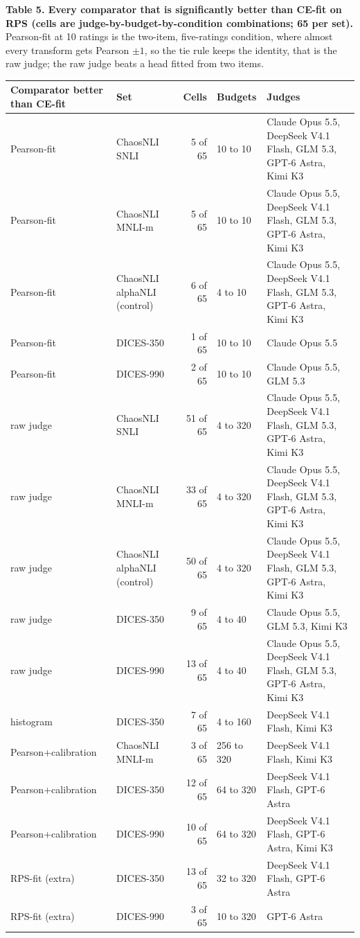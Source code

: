 \documentclass[10pt]{article}
\begin{document}
\textbf{Table 5. Every comparator that is significantly better than CE-fit on RPS (cells are judge-by-budget-by-condition combinations; 65 per set).} Pearson-fit at 10 ratings is the two-item, five-ratings condition, where almost every transform gets Pearson $\pm1$, so the tie rule keeps the identity, that is the raw judge; the raw judge beats a head fitted from two items.\par
\scriptsize
\begin{tabular}{llrlp{3.4in}}\toprule
Comparator better than CE-fit & Set & Cells & Budgets & Judges \\ \midrule
Pearson-fit & ChaosNLI SNLI & 5 of 65 & 10 to 10 & Claude Opus 5.5, DeepSeek V4.1 Flash, GLM 5.3, GPT-6 Astra, Kimi K3 \\
Pearson-fit & ChaosNLI MNLI-m & 5 of 65 & 10 to 10 & Claude Opus 5.5, DeepSeek V4.1 Flash, GLM 5.3, GPT-6 Astra, Kimi K3 \\
Pearson-fit & ChaosNLI alphaNLI (control) & 6 of 65 & 4 to 10 & Claude Opus 5.5, DeepSeek V4.1 Flash, GLM 5.3, GPT-6 Astra, Kimi K3 \\
Pearson-fit & DICES-350 & 1 of 65 & 10 to 10 & Claude Opus 5.5 \\
Pearson-fit & DICES-990 & 2 of 65 & 10 to 10 & Claude Opus 5.5, GLM 5.3 \\
raw judge & ChaosNLI SNLI & 51 of 65 & 4 to 320 & Claude Opus 5.5, DeepSeek V4.1 Flash, GLM 5.3, GPT-6 Astra, Kimi K3 \\
raw judge & ChaosNLI MNLI-m & 33 of 65 & 4 to 320 & Claude Opus 5.5, DeepSeek V4.1 Flash, GLM 5.3, GPT-6 Astra, Kimi K3 \\
raw judge & ChaosNLI alphaNLI (control) & 50 of 65 & 4 to 320 & Claude Opus 5.5, DeepSeek V4.1 Flash, GLM 5.3, GPT-6 Astra, Kimi K3 \\
raw judge & DICES-350 & 9 of 65 & 4 to 40 & Claude Opus 5.5, GLM 5.3, Kimi K3 \\
raw judge & DICES-990 & 13 of 65 & 4 to 40 & Claude Opus 5.5, DeepSeek V4.1 Flash, GLM 5.3, GPT-6 Astra, Kimi K3 \\
histogram & DICES-350 & 7 of 65 & 4 to 160 & DeepSeek V4.1 Flash, Kimi K3 \\
Pearson+calibration & ChaosNLI MNLI-m & 3 of 65 & 256 to 320 & DeepSeek V4.1 Flash, Kimi K3 \\
Pearson+calibration & DICES-350 & 12 of 65 & 64 to 320 & DeepSeek V4.1 Flash, GPT-6 Astra \\
Pearson+calibration & DICES-990 & 10 of 65 & 64 to 320 & DeepSeek V4.1 Flash, GPT-6 Astra, Kimi K3 \\
RPS-fit (extra) & DICES-350 & 13 of 65 & 32 to 320 & DeepSeek V4.1 Flash, GPT-6 Astra \\
RPS-fit (extra) & DICES-990 & 3 of 65 & 10 to 320 & GPT-6 Astra \\
\bottomrule\end{tabular}
\end{document}
